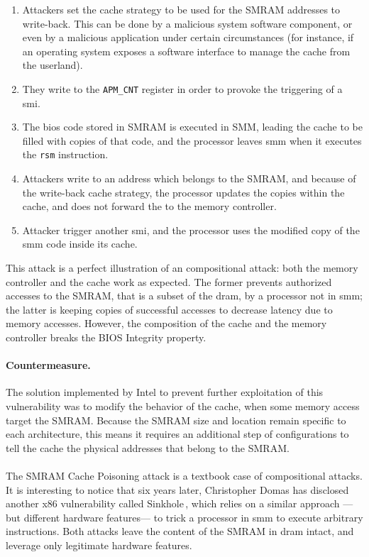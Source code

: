 \begin{enumerate}
\item Attackers set the cache strategy to be used for the SMRAM addresses to
  write-back.
  This can be done by a malicious system software component, or even by a
  malicious application under certain circumstances (for instance, if an
  operating system exposes a software interface to manage the cache from the
  userland).
%
\item They write to the \texttt{APM\_CNT} register in order to provoke the
  triggering of a \ac{smi}.
%
\item The \ac{bios} code stored in SMRAM is executed in SMM, leading the cache
  to be filled with copies of that code, and the processor leaves \ac{smm} when
  it executes the \texttt{rsm} instruction.
%
\item Attackers write to an address which belongs to the SMRAM, and because of
  the write-back cache strategy, the processor updates the copies within the
  cache, and does not forward the \IO to the memory controller.
%
\item Attacker trigger another \ac{smi}, and the processor uses the modified
  copy of the \ac{smm} code inside its cache.
\end{enumerate}
%
This attack is a perfect illustration of an compositional attack:
%
both the memory controller and the cache work as expected.
%
The former prevents authorized accesses to the SMRAM, that is a subset of the
\ac{dram}, by a processor not in \ac{smm};
%
the latter is keeping copies of successful accesses to decrease latency due to
memory accesses.
%
However, the composition of the cache and the memory controller breaks the BIOS
Integrity property.

\paragraph{Countermeasure.}
%
The solution implemented by Intel to prevent further exploitation of this
vulnerability was to modify the behavior of the cache, when some memory access
target the SMRAM.
%
Because the SMRAM size and location remain specific to each architecture, this
means it requires an additional step of configurations to tell the cache the
physical addresses that belong to the SMRAM.

\paragraph{}
%
The SMRAM Cache Poisoning attack is a textbook case of compositional attacks.
%
It is interesting to notice that six years later, Christopher Domas has
disclosed another x86 vulnerability called Sinkhole\,\cite{domas2015sinkhole},
which relies on a similar approach ---but different hardware features--- to
trick a processor in \ac{smm} to execute arbitrary instructions.
%
Both attacks leave the content of the SMRAM in \ac{dram} intact, and leverage
only legitimate hardware features.

